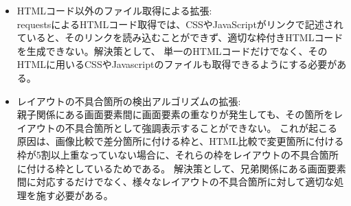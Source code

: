 \begin{itemize}
      \item HTMLコード以外のファイル取得による拡張:\\
            requestsによるHTMLコード取得では、CSSやJavaScriptがリンクで記述されていると、そのリンクを読み込むことができず、適切な枠付きHTMLコードを生成できない。解決策として、
            単一のHTMLコードだけでなく、そのHTMLに用いるCSSやJavascriptのファイルも取得できるようにする必要がある。
      \item レイアウトの不具合箇所の検出アルゴリズムの拡張:\\
            親子関係にある画面要素間に画面要素の重なりが発生しても、その箇所をレイアウトの不具合箇所として強調表示することができない。
            これが起こる原因は、画像比較で差分箇所に付ける枠と、HTML比較で変更箇所に付ける枠が5割以上重なっていない場合に、それらの枠をレイアウトの不具合箇所に付ける枠としているためである。
            解決策として、兄弟関係にある画面要素間に対応するだけでなく、様々なレイアウトの不具合箇所に対して適切な処理を施す必要がある。
\end{itemize}







